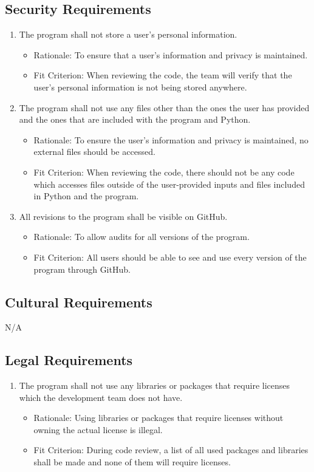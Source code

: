 \documentclass[12pt, titlepage]{article}
\begin{document}
\subsection{Security Requirements}
\begin{enumerate}[{SR}1. ]
\item \label{SR1} The program shall not store a user's personal information.
    \begin{itemize} 
        \item Rationale: To ensure that a user's information and privacy is maintained.
        \item Fit Criterion: When reviewing the code, the team will verify that the user's personal information is not being stored anywhere. 
    \end{itemize} 
\item \label{SR2} The program shall not use any files other than the ones the user has provided and the ones that are included with the program and Python.
    \begin{itemize} 
        \item Rationale: To ensure the user's information and privacy is maintained, no external files should be accessed.
        \item Fit Criterion: When reviewing the code, there should not be any code which accesses files outside of the user-provided inputs and files included in Python and the program.
    \end{itemize}
\item \label{SR3} All revisions to the program shall be visible on GitHub.
    \begin{itemize} 
        \item Rationale: To allow audits for all versions of the program.
        \item Fit Criterion: All users should be able to see and use every version of the program through GitHub.
    \end{itemize} 
\end{enumerate}

\subsection{Cultural Requirements}
N/A

\subsection{Legal Requirements}
\begin{enumerate}[{LR}1. ]
    \item \label{LR1} The program shall not use any libraries or packages that require licenses which the development team does not have.
    \begin{itemize}
        \item Rationale: Using libraries or packages that require licenses without owning the actual license is illegal.
        \item Fit Criterion: During code review, a list of all used packages and libraries shall be made and none of them will require licenses.
    \end{itemize}
\end{enumerate}
\end{document}
